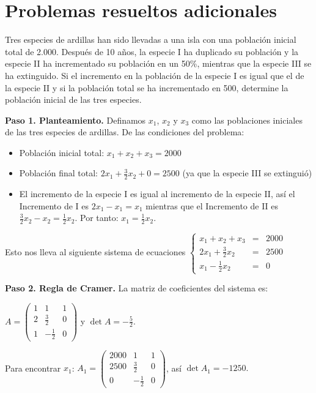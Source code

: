 \section{Problemas resueltos adicionales}

\begin{prob} Tres especies de ardillas han sido llevadas a una isla con una población inicial total de 2.000. Después de 10 años, la especie I ha duplicado su población y la especie II ha incrementado su población en un 50\%, mientras que la especie III se ha extinguido. Si el incremento en la población de la especie I es igual que el de la especie II y si la población total se ha incrementado en 500, determine la población inicial de las tres especies.

\begin{myproof}
\textbf{Paso 1. Planteamiento.} Definamos $x_1$, $x_2$ y $x_3$ como las poblaciones iniciales de las tres especies de ardillas. De las condiciones del problema:
\begin{itemize}
    \item Población inicial total: $x_1 + x_2 + x_3 = 2000$
    \item Población final total: $2x_1 + \frac{3}{2}x_2 + 0 = 2500$ (ya que la especie III se extinguió)
    \item El incremento de la especie I es igual al incremento de la especie II, así el Incremento de I es $2x_1 - x_1 = x_1$ mientras que el Incremento de II es $\frac{3}{2}x_2 - x_2 = \frac{1}{2}x_2.$ Por tanto: $x_1 = \frac{1}{2}x_2.$
\end{itemize}

Esto nos lleva al siguiente sistema de ecuaciones \(
\left\{
\begin{array}{rcl}
x_1 + x_2 + x_3 &=& 2000\\
2x_1 + \frac{3}{2}x_2 &=& 2500\\
x_1 - \frac{1}{2}x_2 &=& 0
\end{array}
\right.
\)

\textbf{Paso 2. Regla de Cramer.} La matriz de coeficientes del sistema es:


\(
A = \begin{pmatrix}
1 & 1 & 1\\
2 & \frac{3}{2} & 0\\
1 & -\frac{1}{2} & 0
\end{pmatrix}
\)  y $\det A = -\frac{5}{2}.$

Para encontrar $x_1$: \(
A_1 = \begin{pmatrix}
2000 & 1 & 1\\
2500 & \frac{3}{2} & 0\\
0 & -\frac{1}{2} & 0
\end{pmatrix}
\), así \( \det A_1 = -1250 .\)


\end{myproof}
\end{prob}
